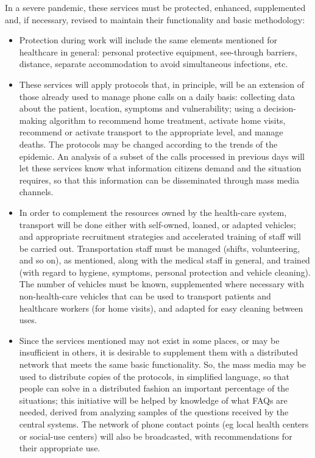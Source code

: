 \documentclass[12pt, a4]{scrartcl}
\begin{document}
In a severe pandemic, these services must be protected, enhanced, supplemented and, if necessary, revised to maintain their functionality and basic methodology:
\begin{itemize}
	\item Protection during work will include the same elements mentioned for healthcare in general: personal protective equipment, see-through barriers, distance, separate accommodation to avoid simultaneous infections, etc.
	\item These services will apply protocols that, in principle, will be an extension of those already used to manage phone calls on a daily basis: collecting data about the patient, location, symptoms and vulnerability; using a decision-making algorithm to recommend home treatment, activate home visits, recommend or activate transport to the appropriate level, and manage deaths. The protocols may be changed according to the trends of the epidemic. An analysis of a subset of the calls processed in previous days will let these services know what information citizens demand and the situation requires, so that this information can be disseminated through mass media channels.
	\item In order to complement the resources owned by the health-care system, transport will be done either with self-owned, loaned, or adapted vehicles; and appropriate recruitment strategies and accelerated training of staff will be carried out. Transportation staff must be managed (shifts, volunteering, and so on), as mentioned, along with the medical staff in general, and trained (with regard to hygiene, symptoms, personal protection and vehicle cleaning). The number of vehicles must be known, supplemented where necessary with non-health-care vehicles that can be used to transport patients and healthcare workers (for home visits), and adapted for easy cleaning between uses.
	\item Since the services mentioned may not exist in some places, or may be insufficient in others, it is desirable to supplement them with a distributed network that meets the same basic functionality. So, the mass media may be used to distribute copies of the protocols, in simplified language, so that people can solve in a distributed fashion an important percentage of the situations; this initiative will be helped by knowledge of what FAQs are needed, derived from analyzing samples of the questions received by the central systems. The network of phone contact points (eg local health centers or social-use centers) will also be broadcasted, with recommendations for their appropriate use.
\end{itemize}
\end{document}
